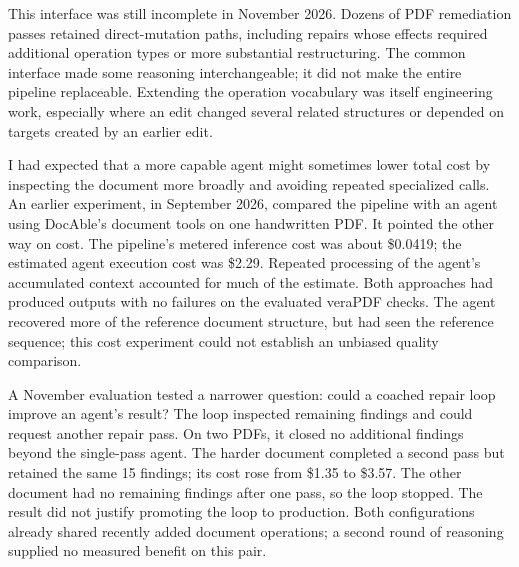 This interface was still incomplete in November 2026. Dozens of PDF remediation passes retained direct-mutation paths, including repairs whose effects required additional operation types or more substantial restructuring. The common interface made some reasoning interchangeable; it did not make the entire pipeline replaceable. Extending the operation vocabulary was itself engineering work, especially where an edit changed several related structures or depended on targets created by an earlier edit.


I had expected that a more capable agent might sometimes lower total cost by inspecting the document more broadly and avoiding repeated specialized calls. An earlier experiment, in September 2026, compared the pipeline with an agent using DocAble's document tools on one handwritten PDF. It pointed the other way on cost. The pipeline's metered inference cost was about \$0.0419; the estimated agent execution cost was \$2.29. Repeated processing of the agent's accumulated context accounted for much of the estimate. Both approaches had produced outputs with no failures on the evaluated veraPDF checks. The agent recovered more of the reference document structure, but had seen the reference sequence; this cost experiment could not establish an unbiased quality comparison.


A November evaluation tested a narrower question: could a coached repair loop improve an agent's result? The loop inspected remaining findings and could request another repair pass. On two PDFs, it closed no additional findings beyond the single-pass agent. The harder document completed a second pass but retained the same 15 findings; its cost rose from \$1.35 to \$3.57. The other document had no remaining findings after one pass, so the loop stopped. The result did not justify promoting the loop to production. Both configurations already shared recently added document operations; a second round of reasoning supplied no measured benefit on this pair.

